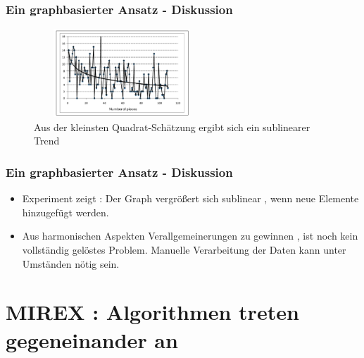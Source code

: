 \documentclass{beamer}
\begin{document}
	\begin{frame}
		\frametitle{Ein graphbasierter Ansatz - Diskussion}
		\begin{figure}[h!]
			\includegraphics[width=250px,height=125px,keepaspectratio]{three_of_two_point_four}
			\caption{Aus der kleinsten Quadrat-Schätzung ergibt sich ein sublinearer Trend \cite{two_point_four}}
		\end{figure}
	\end{frame}

	\begin{frame}
		\frametitle{Ein graphbasierter Ansatz - Diskussion}
		\begin{itemize}
				\item Experiment zeigt : Der Graph vergrößert sich sublinear , wenn neue Elemente hinzugefügt werden.
				\item Aus harmonischen Aspekten Verallgemeinerungen zu gewinnen , ist noch kein vollständig gelöstes Problem. Manuelle Verarbeitung der Daten kann unter Umständen nötig sein.
		\end{itemize}
	\end{frame}





	\section{MIREX : Algorithmen treten gegeneinander an}
\end{document}
